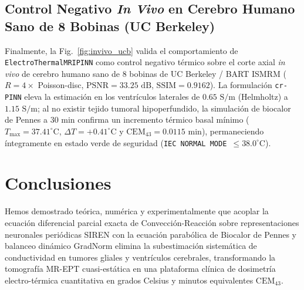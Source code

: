 \documentclass[10pt,journal,compsoc]{IEEEtran}
\begin{document}
\subsection{Control Negativo \textit{In Vivo} en Cerebro Humano Sano de 8 Bobinas (UC Berkeley)}
Finalmente, la Fig.~\ref{fig:invivo_ucb} valida el comportamiento de \texttt{ElectroThermalMRIPINN} como control negativo térmico sobre el corte axial \textit{in vivo} de cerebro humano sano de 8 bobinas de UC Berkeley / BART ISMRM ($R=4\times$ Poisson-disc, $\text{PSNR} = 33.25\text{ dB}$, $\text{SSIM} = 0.9162$). La formulación \texttt{cr-PINN} eleva la estimación en los ventrículos laterales de $0.65\text{ S/m}$ (Helmholtz) a $1.15\text{ S/m}$; al no existir tejido tumoral hipoperfundido, la simulación de biocalor de Pennes a $30\text{ min}$ confirma un incremento térmico basal mínimo ($T_{\max} = 37.41^\circ\text{C}$, $\Delta T = +0.41^\circ\text{C}$ y $\text{CEM}_{43} = 0.0115\text{ min}$), permaneciendo íntegramente en estado verde de seguridad (\texttt{IEC NORMAL MODE $\le 38.0^\circ\text{C}$}).

\section{Conclusiones}
Hemos demostrado teórica, numérica y experimentalmente que acoplar la ecuación diferencial parcial exacta de Convección-Reacción sobre representaciones neuronales periódicas SIREN con la ecuación parabólica de Biocalor de Pennes y balanceo dinámico GradNorm elimina la subestimación sistemática de conductividad en tumores gliales y ventrículos cerebrales, transformando la tomografía MR-EPT cuasi-estática en una plataforma clínica de dosimetría electro-térmica cuantitativa en grados Celsius y minutos equivalentes $\text{CEM}_{43}$.



\end{document}
